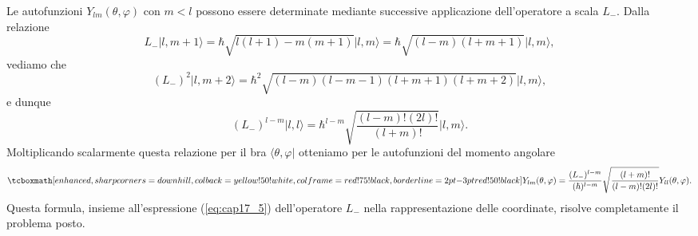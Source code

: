 Le autofunzioni $Y_{lm}(\theta , \varphi)$ con $m<l$ possono essere determinate mediante successive applicazione dell'operatore a scala $L_-$. Dalla relazione
	\begin{equation}
		L_-\vert l, m+1 \rangle = \hbar \sqrt{l(l+1) - m(m+1)} \vert l,m \rangle = \hbar \sqrt{(l-m)(l+m+1)} \vert l,m \rangle ,
	\end{equation}
vediamo che 
	\begin{equation}
	(L_-)^2 \vert l, m+2 \rangle = \hbar ^2 \sqrt{(l-m)(l-m-1)(l+m+1)(l+m+2)}\vert l,m \rangle ,
	\end{equation}
e dunque
	\begin{equation}
	(L_-)^{l-m} \vert l, l \rangle = \hbar ^{l-m} \sqrt{\frac{(l-m)!(2l)!}{(l+m)!}}\vert l,m \rangle .
	\end{equation}
Moltiplicando scalarmente questa relazione per il bra $\langle \theta , \varphi \vert $ otteniamo per le autofunzioni del momento angolare
	\begin{equation}
		\tcboxmath[enhanced, sharp corners=downhill, colback=yellow!50!white, colframe=red!75!black, borderline={2pt}{-3pt}{red!50!black}]{	Y_{lm} (\theta ,  \varphi ) = \frac{(L_-)^{l-m}}{(\hbar )^{l-m}}\sqrt{\frac{(l+m)!}{(l-m)!(2l)!}} Y_{ll} (\theta , \varphi) . 
		}
	\end{equation}
Questa formula, insieme all'espressione (\ref{eq:cap17_5}) dell'operatore $L_-$ nella rappresentazione delle coordinate, risolve completamente il problema posto.\\

